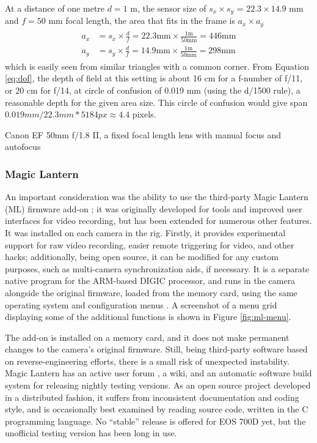 At a distance of one metre $d = 1$ m, the sensor size of $s_x \times s_y$ = $22.3 \times 14.9$ mm and $f = 50$ mm focal length, the area that fits in the frame is $a_x \times a_y$
\begin{align} \label{eq:areasize} \begin{split}
	a_x &= s_x \times \frac{d}{f} = 22.3 \text{mm} \times \frac{1 \text{m}}{50 \text{mm}} = 446 \text{mm}\\
	a_y &= s_y \times \frac{d}{f} = 14.9 \text{mm} \times \frac{1 \text{m}}{50 \text{mm}} = 298 \text{mm}
\end{split} \end{align}
which is easily seen from similar triangles with a common corner.
From Equation \ref{eq:dof}, the depth of field at this setting is about 16 cm for a f-number of f/11, or 20 cm for f/14, at circle of confusion of 0.019 mm (using the d/1500 rule), a reasonable depth for the given area size.
This circle of confusion would give span $0.019 mm / 22.3 mm * 5184 px \approx 4.4$ pixels.

{Canon EF 50mm f/1.8 II, a fixed focal length lens with manual focus and autofocus}

\subsubsection{Magic Lantern}

An important consideration was the ability to use the third-party Magic Lantern (ML) firmware add-on \cite{magiclantern};
it was originally developed for tools and improved user interfaces for video recording, but has been extended for numerous other features.
It was installed on each camera in the rig.
Firstly, it provides experimental support for raw video recording, easier remote triggering for video, and other hacks;
additionally, being open source, it can be modified for any custom purposes, such as multi-camera synchronization aids, if necessary.
It is a separate native program for the ARM-based DIGIC processor, and runs in the camera alongside the original firmware, loaded from the memory card, using the same operating system and configuration menus \cite{magiclantern}.
A screenshot of a menu grid displaying some of the additional functions is shown in Figure \ref{fig:ml-menu}.

The add-on is installed on a memory card, and it does not make permanent changes to the camera's original firmware.
Still, being third-party software based on reverse-engineering efforts, there is a small risk of unexpected instability.
Magic Lantern has an active user forum \cite{magiclanternforum}, a wiki, and an automatic software build system for releasing nightly testing versions.
As an open source project developed in a distributed fashion, it suffers from inconsistent documentation and coding style, and is occasionally best examined by reading source code, written in the C programming language.
No ``stable'' release is offered for EOS 700D yet, but the unofficial testing version has been long in use.

